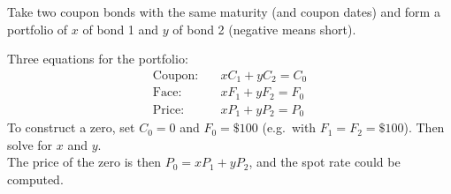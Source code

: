 Take two coupon bonds with the same maturity (and coupon dates) and form a portfolio of $x$ of bond 1 and $y$ of bond 2 (negative means short).

\begin{center}
\end{center}

Three equations for the portfolio:
\[\boxed{\begin{aligned}
    \text{Coupon:} &\quad xC_1 + yC_2 = C_0 \\
    \text{Face:} &\quad xF_1 + yF_2 = F_0 \\
    \text{Price:} &\quad xP_1 + yP_2 = P_0
\end{aligned}}\]
To construct a zero, set $C_0 = 0$ and $F_0 = \$100$ (e.g.\ with $F_1 = F_2 = \$100$). Then solve for $x$ and $y$. 
\\The price of the zero is then $P_0 = xP_1 + yP_2$, and the spot rate could be computed.

